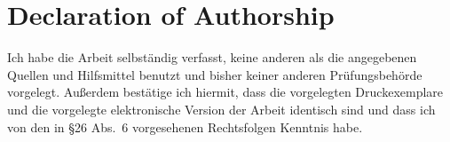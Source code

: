 \printbibliography

\newpage\clearpage\newpage

\chapter*{Declaration of Authorship}

Ich habe die Arbeit selbst{\"a}ndig verfasst, keine anderen als die angegebenen
Quellen und Hilfsmittel benutzt und bisher keiner anderen
Pr{\"u}fungsbeh{\"o}rde vorgelegt. Au{\ss}erdem best{\"a}tige ich hiermit, dass
die vorgelegten Druckexemplare und die vorgelegte elektronische Version der
Arbeit identisch sind und dass ich von den in \S 26 Abs.\ 6 vorgesehenen
Rechtsfolgen Kenntnis habe.

\vspace{1.5cm}

